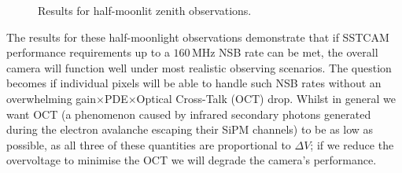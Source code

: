 \begin{figure}[t!]
\begin{minipage}{\linewidth}\centering
{}

\caption{Results for half-moonlit zenith observations.}
\label{fig:hm}

\end{minipage}
\end{figure}
The results for these half-moonlight observations demonstrate that if SSTCAM performance requirements up to a $\mathrm{160\,MHz}$ NSB rate can be met, the overall camera will function well under most realistic observing scenarios. The question becomes if individual pixels will be able to handle such NSB rates without an overwhelming gain$\times$PDE$\times$Optical Cross-Talk (OCT) drop. Whilst in general we want OCT (a phenomenon caused by infrared secondary photons generated during the electron avalanche escaping their SiPM channels) to be as low as possible, as all three of these quantities are proportional to $\Delta V$; if we reduce the overvoltage to minimise the OCT we will degrade the camera's performance.

